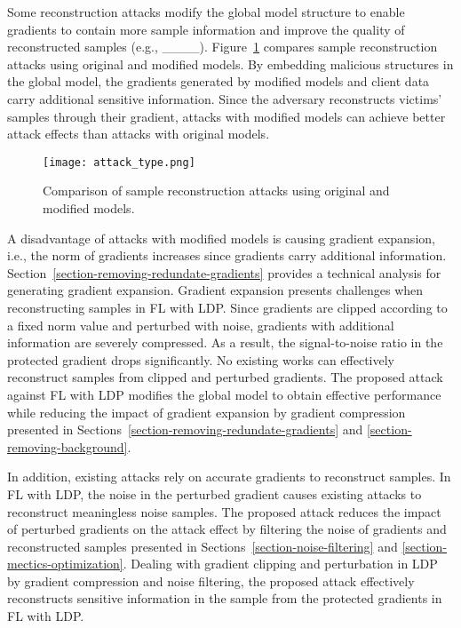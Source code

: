 Some reconstruction attacks modify the global model structure to enable gradients to contain more sample information and improve the quality of reconstructed samples (e.g., ____). Figure~\ref{fig:attack_type} compares sample reconstruction attacks using original and modified models. By embedding malicious structures in the global model, the gradients generated by modified models and client data carry additional sensitive information. Since the adversary reconstructs victims' samples through their gradient, attacks with modified models can achieve better attack effects than attacks with original models.

\begin{figure}
\centering
\texttt{[image: attack\_type.png]}
\caption{Comparison of sample reconstruction attacks using original and modified models.}
\label{fig:attack_type}
\end{figure}

A disadvantage of attacks with modified models is causing gradient expansion, i.e., the norm of gradients increases since gradients carry additional information. Section~\ref{section-removing-redundate-gradients} provides a technical analysis for generating gradient expansion. Gradient expansion presents challenges when reconstructing samples in FL with LDP. Since gradients are clipped according to a fixed norm value and perturbed with noise, gradients with additional information are severely compressed. As a result, the signal-to-noise ratio in the protected gradient drops significantly. No existing works can effectively reconstruct samples from clipped and perturbed gradients. The proposed attack against FL with LDP modifies the global model to obtain effective performance while reducing the impact of gradient expansion by gradient compression presented in Sections~\ref{section-removing-redundate-gradients} and \ref{section-removing-background}.

In addition, existing attacks rely on accurate gradients to reconstruct samples. In FL with LDP, the noise in the perturbed gradient causes existing attacks to reconstruct meaningless noise samples. The proposed attack reduces the impact of perturbed gradients on the attack effect by filtering the noise of gradients and reconstructed samples presented in Sections~\ref{section-noise-filtering} and \ref{section-mectics-optimization}. Dealing with gradient clipping and perturbation in LDP by gradient compression and noise filtering, the proposed attack effectively reconstructs sensitive information in the sample from the protected gradients in FL with LDP.